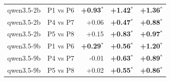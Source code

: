 \begin{table}[p]
\begin{tabular}{llrrr}
qwen3.5-2b & P1 vs P6 & \textbf{+0.93$^{*}$} & \textbf{+1.42$^{*}$} & \textbf{+1.36$^{*}$} \\
qwen3.5-2b & P4 vs P7 & +0.06 & \textbf{+0.47$^{*}$} & \textbf{+0.88$^{*}$} \\
qwen3.5-2b & P5 vs P8 & +0.15 & \textbf{+0.83$^{*}$} & \textbf{+0.97$^{*}$} \\
qwen3.5-9b & P1 vs P6 & \textbf{+0.29$^{*}$} & \textbf{+0.56$^{*}$} & \textbf{+1.20$^{*}$} \\
qwen3.5-9b & P4 vs P7 & -0.01 & \textbf{+0.63$^{*}$} & \textbf{+0.89$^{*}$} \\
qwen3.5-9b & P5 vs P8 & +0.02 & \textbf{+0.55$^{*}$} & \textbf{+0.86$^{*}$} \\
\bottomrule
\end{tabular}
\end{table}
